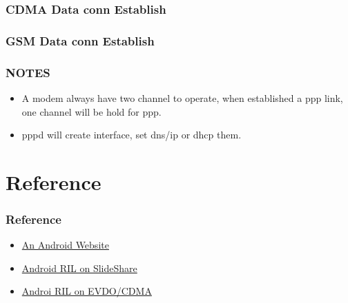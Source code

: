 \documentclass{beamer}
\begin{document}
\begin{frame}
    \frametitle{CDMA Data conn Establish}
\end{frame}

\begin{frame}
    \frametitle{GSM Data conn Establish}
\end{frame}

\begin{frame}
    \frametitle{NOTES}
    \begin{itemize}
        \item A modem always have two channel to operate, when established a ppp link, one channel will be hold for ppp.
        \item pppd will create interface, set dns/ip or dhcp them.
    \end{itemize}
\end{frame}

\section{Reference}
\begin{frame}
    \frametitle{Reference}
    \begin{itemize}
        \item \href{http://www.netmite.com/android/mydroid/development/pdk/docs/telephony.html}{An Android Website}
        \item \href{http://www.slideshare.net/dpsmarques/android-ril}{Android RIL on SlideShare}
        \item \href{http://blogold.chinaunix.net/u3/93670/showart_2238540.html}{Androi RIL on EVDO/CDMA}
    \end{itemize}
\end{frame}
\end{document}
